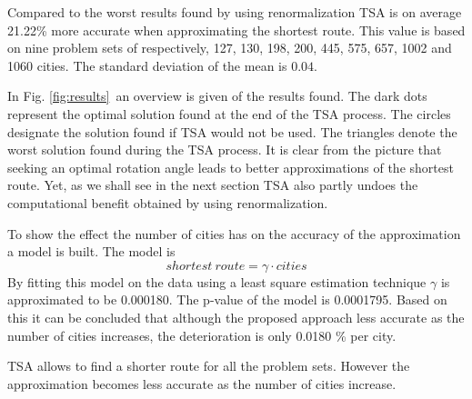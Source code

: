 Compared to the worst results found by using renormalization TSA is on average
21.22\% more accurate when approximating the shortest route. This value is
based on nine problem sets of respectively, 127, 130, 198, 200, 445, 575, 657,
1002 and 1060 cities. The standard deviation of the mean is $0.04$. 

In Fig. \ref{fig:results}~an overview is given of the results found. The
dark dots represent the optimal solution found at the end of the TSA process.
The circles designate the solution found if TSA would not be used. The
triangles denote the worst solution found during the TSA process. It is clear
from the picture that seeking an optimal rotation angle leads to better
approximations of the shortest route. Yet, as we shall see in the next section
TSA also partly undoes the computational benefit obtained by using renormalization.

To show the effect the number of cities has on the accuracy of the approximation a
model is built. The model is 
\[ 
	shortest~route = \gamma \cdot cities 
\]
By fitting this model on the data using a least square estimation technique
$\gamma$ is approximated to be 0.000180. The p-value of the model is
0.0001795. Based on this it can be concluded that although the proposed
approach less accurate as the number of cities increases, the deterioration is
only 0.0180 \% per city.

TSA allows to find a shorter route for all the problem sets. However the
approximation becomes less accurate as the number of cities increase. 


